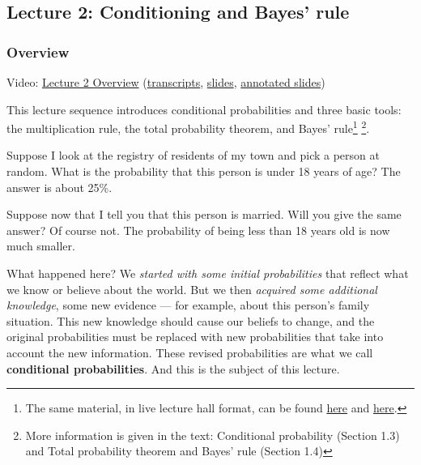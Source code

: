 \documentclass[pdftex, brazil, 12pt, twoside]{article}
\begin{document}
\subsection{Lecture 2: Conditioning and Bayes' rule}
\label{un2-lec2}

\subsubsection{Overview}
\label{un2-lec2-ovw}

Video: \href{https://www.youtube.com/watch?v=5ucMVcxALKA}{Lecture 2 Overview}
(\href{Unit-2/01\_lecture\_2/l02\_1\_transcripts.pdf}{transcripts},
\href{Unit-2/01\_lecture\_2/l02\_1\_slides.pdf}{slides},
\href{Unit-2/01\_lecture\_2/l02\_1\_slides\_annotated.pdf}{annotated slides})

This lecture sequence introduces conditional probabilities and three basic tools:
the multiplication rule, the total probability theorem, and Bayes' rule\footnote{The
  same material, in live lecture hall format, can be found
  \href{http://ocw.mit.edu/courses/electrical-engineering-and-computer-science/6-041-probabilistic-systems-analysis-and-applied-probability-fall-2010/video-lectures/lecture-2-conditioning-and-bayes-rule/}{here} and \href{http://www.youtube.com/watch?v=TluTv5V0RmE}{here}.}
\footnote{More information is given in the text: Conditional probability (Section 1.3)
  and Total probability theorem and Bayes' rule (Section 1.4)}.

Suppose I look at the registry of residents of my town and
pick a person at random.
What is the probability that this person is
under 18 years of age?
The answer is about 25\%.

Suppose now that I tell you that this person is married.
Will you give the same answer? Of course not.
The probability of being less than 18 years
old is now much smaller.

What happened here?
We \emph{started with some initial probabilities} that reflect
what we know or believe about the world.
But we then \emph{acquired some additional
knowledge}, some new evidence ---
for example, about this person's family situation.
This new knowledge should cause our beliefs to change,
and the original probabilities must be replaced with new
probabilities that take into account the new information.
These revised probabilities are what we call \textbf{conditional
  probabilities}.
And this is the subject of this lecture.
\end{document}
